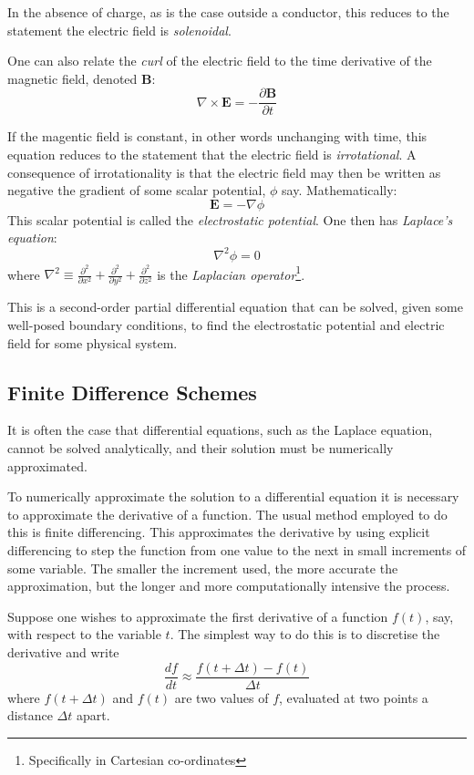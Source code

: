 \documentclass[12pt, a4paper]{article}
\newcommand{\be}{\begin{equation}}
\newcommand{\ee}{\end{equation}}
\begin{document}
In the absence of charge, as is the case outside a conductor, this reduces to the
statement the electric field is \emph{solenoidal}.

One can also relate the \emph{curl} of the electric field to the time
derivative of the magnetic field, denoted \textbf{B}:
%
\be
\nabla \times \bm{E} = - \frac{\partial \bm{B}}{\partial t}
\ee

If the magentic field is constant, in other words unchanging with time, this equation
reduces to the statement that the electric field is \emph{irrotational}. A
consequence of irrotationality is that the electric field may then be written as
negative the gradient of some scalar potential, $\phi$ say. Mathematically:
%
\be
\bm{E} = -\nabla \phi
\ee
%
This scalar potential is called the \emph{electrostatic potential}.
One then has \emph{Laplace's equation}:
%
\be
\nabla^2 \phi = 0
\ee
%
where
$\nabla^2 \equiv \frac{\partial^2}{\partial x^2}+\frac{\partial^2}{\partial y^2}+\frac{\partial^2}{\partial z^2}$ 
is the \emph{Laplacian operator}\footnote{Specifically in Cartesian co-ordinates}.

This is a second-order partial differential equation that can be solved, given some
well-posed boundary conditions, to find the electrostatic potential and electric field
for some physical system.

\subsection{Finite Difference Schemes}

It is often the case that differential equations, such as the Laplace equation, cannot
be solved analytically, and their solution must be numerically approximated.

To numerically approximate the solution to a differential equation it is
necessary to approximate the derivative of a function. The usual method employed to
do this is finite differencing. This approximates the derivative by using explicit
differencing to step the function from one value to the next in small 
increments of some variable. The smaller the increment used, the more accurate
the approximation, but the longer and more computationally intensive the process.

Suppose one wishes to approximate the first derivative of a function $f(t)$, say,
with respect to the variable $t$. The simplest way to do this is to discretise the
derivative and write
%
\be
\frac{df}{dt} \approx \frac{f(t+\Delta t) - f(t)}{\Delta t}
\ee
%
where $f(t+\Delta t)$ and $f(t)$ are two values of $f$, evaluated at two points
a distance $\Delta t$ apart.
\end{document}
